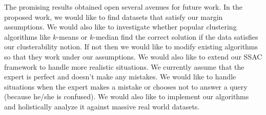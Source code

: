 The promising results obtained open several avenues for future work. In the proposed work, we would like to find datasets that satisfy our margin assumptions. We would also like to investigate whether popular clustering algorithms like $k$-means or $k$-median find the correct solution if the data satisfies our clusterability notion. If not then we would like to modify existing algorithms so that they work under our assumptions. We would also like to extend our SSAC framework to handle more realistic situations. We currently assume that the expert is perfect and doesn't make any mistakes. We would like to handle situations when the expert makes a mistake or chooses not to answer a query (because he/she is confused). We would also like to implement our algorithms and holistically analyze it against massive real world datasets.

\cleardoublepage

\cleardoublepage

\renewcommand\contentsname{Table of Contents}
\tableofcontents
\cleardoublepage
{}

\listoftables
\cleardoublepage
{}		%

\listoffigures
\cleardoublepage
{}		%



